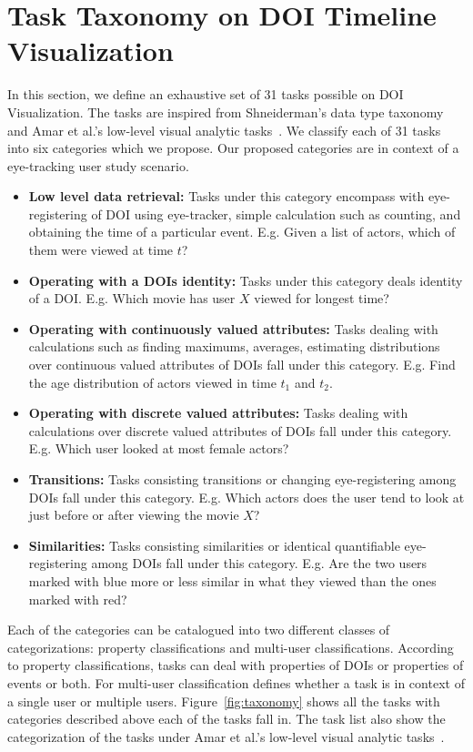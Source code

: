 \section{Task Taxonomy on DOI Timeline Visualization}

In this section, we define an exhaustive set of 31 tasks possible on  DOI Visualization. The tasks are inspired from Shneiderman's data type taxonomy~\cite{shneiderman1996eyes} and Amar et al.'s low-level visual analytic tasks~\cite{amar2005low}. We classify each of 31 tasks into six categories which we propose. Our proposed categories are in context of a eye-tracking user study scenario. 
\begin{itemize}
	\item \textbf{Low level data retrieval:} Tasks under this category encompass with eye-registering of DOI using eye-tracker, simple calculation such as counting, and obtaining the time of a particular event. E.g. Given a list of actors, which of them were viewed at time $t$?
	\item \textbf{Operating with a DOIs identity:} Tasks under this category deals identity of a DOI. E.g. Which movie has user $X$ viewed for longest time?
	\item \textbf{Operating with continuously valued attributes:} Tasks dealing with calculations such as finding maximums, averages, estimating distributions over continuous valued attributes of DOIs fall under this category. E.g. Find the age distribution of actors viewed in time $t_1$ and $t_2$.
	\item \textbf{Operating with discrete valued attributes:} Tasks dealing with calculations  over discrete valued attributes of DOIs fall under this category. E.g. Which user looked at most female actors?
	\item \textbf{Transitions:} Tasks consisting transitions or changing eye-registering among DOIs fall under this category. E.g. Which actors  does the user tend to look at just before or after  viewing the movie $X$?
	\item \textbf{Similarities:} Tasks consisting similarities or identical quantifiable eye-registering among DOIs fall under this category. E.g. Are the two users marked with blue more or less similar in what they viewed than the ones marked with red?
\end{itemize} 
 Each of the categories can be catalogued into two different classes of categorizations: property classifications and multi-user classifications. According to property classifications, tasks can deal with properties of DOIs or properties of events or both. For multi-user classification defines whether a task is in context of a single user or multiple users. Figure~\ref{fig:taxonomy} shows all the tasks with categories described above each of the tasks fall in. The task list also show the categorization of the tasks under Amar et al.'s low-level visual analytic tasks~\cite{amar2005low}.


